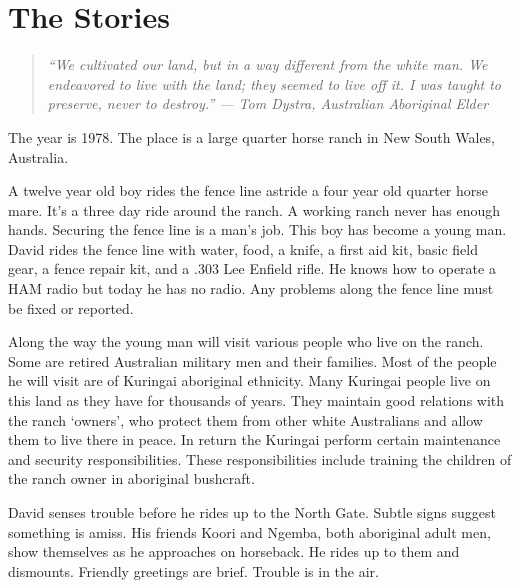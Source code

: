 

\chapter{The Stories}
\label{ch:t2-stories}


\begin{quote}\small\textit{%
``We cultivated our land, but in a way different from the white man. We endeavored to live with the land; they seemed to live off it. I was taught to preserve, never to destroy.'' --- Tom Dystra, Australian Aboriginal Elder
}\end{quote}

\vspace{0.5cm}

The year is 1978.  The place is a large quarter horse ranch in New South Wales, Australia.

A twelve year old boy rides the fence line astride a four year old quarter horse mare.  It's a three day ride around the ranch.  A working ranch never has enough hands.  Securing the fence line is a man's job.  This boy has become a young man.  David rides the fence line with water, food, a knife, a first aid kit, basic field gear, a fence repair kit, and a .303 Lee Enfield rifle.  He knows how to operate a HAM radio but today he has no radio. Any problems along the fence line must be fixed or reported.

Along the way the young man will visit various people who live on the ranch.  Some are retired Australian military men and their families.  Most of the people he will visit are of Kuringai aboriginal ethnicity. Many Kuringai people live on this land as they have for thousands of years.  They maintain good relations with the ranch `owners', who protect them from other white Australians and allow them to live there in peace. In return the Kuringai perform certain maintenance and security responsibilities. These responsibilities include training the children of the ranch owner in aboriginal bushcraft.

David senses trouble before he rides up to the North Gate.  Subtle signs suggest something is amiss.  His friends Koori and Ngemba, both aboriginal adult men, show themselves as he approaches on horseback.  He rides up to them and dismounts.  Friendly greetings are brief. Trouble is in the air.

